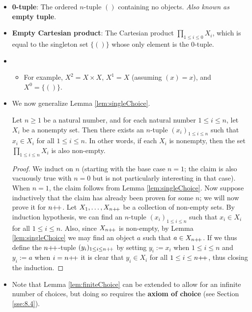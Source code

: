 \documentclass[../main.tex]{subfiles}
\begin{document}
\begin{itemize}
    \item \textbf{0-tuple}: The ordered $n$-tuple $()$ containing no objects. \emph{Also known as} \textbf{empty tuple}.
    \item \textbf{Empty Cartesian product}: The Cartesian product $\prod_{1\leq i\leq 0}X_i$, which is equal to the singleton set $\{()\}$ whose only element is the 0-tuple.
    \item {}
    \begin{itemize}
        \item For example, $X^2=X\times X$, $X^1=X$ (assuming $(x)=x$), and $X^0=\{()\}$.
    \end{itemize}
    \item We now generalize Lemma \ref{lem:singleChoice}.
    \begin{lem}\label{lem:finiteChoice}
        Let $n\geq 1$ be a natural number, and for each natural number $1\leq i\leq n$, let $X_i$ be a nonempty set. Then there exists an $n$-tuple $(x_i)_{1\leq i\leq n}$ such that $x_i\in X_i$ for all $1\leq i\leq n$. In other words, if each $X_i$ is nonempty, then the set $\prod_{1\leq i\leq n}X_i$ is also non-empty.
        \begin{proof}
            We induct on $n$ (starting with the base case $n=1$; the claim is also vacuously true with $n=0$ but is not particularly interesting in that case). When $n=1$, the claim follows from Lemma \ref{lem:singleChoice}. Now suppose inductively that the claim has already been proven for some $n$; we will now prove it for $n{+\!+}$. Let $X_1,\dots,X_{n{+\!+}}$ be a collection of non-empty sets. By induction hypothesis, we can find an $n$-tuple $(x_i)_{1\leq i\leq n}$ such that $x_i\in X_i$ for all $1\leq i\leq n$. Also, since $X_{n{+\!+}}$ is non-empty, by Lemma \ref{lem:singleChoice} we may find an object $a$ such that $a\in X_{n{+\!+}}$. If we thus define the $n{+\!+}$-tuple $(y_i)_{1\leq i\leq n{+\!+}}$ by setting $y_i:=x_i$ when $1\leq i\leq n$ and $y_i:=a$ when $i=n{+\!+}$ it is clear that $y_i\in X_i$ for all $1\leq i\leq n{+\!+}$, thus closing the induction.
        \end{proof}
    \end{lem}
    \item Note that Lemma \ref{lem:finiteChoice} can be extended to allow for an infinite number of choices, but doing so requires the \textbf{axiom of choice} (see Section \ref{sse:8.4}).
\end{itemize}
\end{document}
